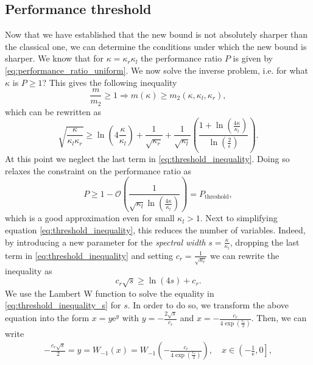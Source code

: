 \subsection{Performance threshold}\label{sec:performance_threshold}
Now that we have established that the new bound is not absolutely sharper than the classical one, we can determine the conditions under which the new bound is sharper. We know that for $\kappa=\kappa_r\kappa_l$ the performance ratio $P$ is given by \cref{eq:performance_ratio_uniform}. We now solve the inverse problem, i.e. for what $\kappa$ is $P \geq 1$? This gives the following inequality
\[
    \frac{m}{m_2} \geq 1 \Rightarrow m(\kappa) \geq m_2(\kappa, \kappa_l, \kappa_r),
\]
which can be rewritten as
\begin{equation}
    \sqrt{\frac{\kappa}{\kappa_l\kappa_r}} \geq \ln\left(4\frac{\kappa}{\kappa_l}\right) + \frac{1}{\sqrt{\kappa_r}} + \frac{1}{\sqrt{\kappa_l}}\left(\frac{1 + \ln\left(\frac{4\kappa}{\kappa_l}\right)}{\ln\left(\frac{2}{\epsilon}\right)}\right).
    \label{eq:threshold_inequality}
\end{equation}
At this point we neglect the last term in \cref{eq:threshold_inequality}. Doing so relaxes the constraint on the performance ratio as
\begin{equation}
    P \geq 1 - \mathcal{O}\left(\frac{1}{\sqrt{\kappa_l}\ln\left(\frac{4\kappa}{\kappa_l}\right)}\right) = P_{\text{threshold}},
    \label{eq:approximate_performance_ratio_threshold}
\end{equation}
which is a good approximation even for small $\kappa_l> 1$. Next to simplifying equation \cref{eq:threshold_inequality}, this reduces the number of variables. Indeed, by introducing a new parameter for the \textit{spectral width} $s = \frac{\kappa}{\kappa_l}$, dropping the last term in \cref{eq:threshold_inequality} and setting $c_r = \frac{1}{\sqrt{\kappa_r}}$ we can rewrite the inequality as
\begin{equation}
    c_r\sqrt{s} \geq \ln\left(4s\right) + c_r.
    \label{eq:threshold_inequality_s}
\end{equation}
We use the Lambert $\mathrm{W}$ function to solve the equality in \cref{eq:threshold_inequality_s} for $s$. In order to do so, we transform the above equation into the form $x = y \mathrm{e}^y$ with $y = -\frac{2\sqrt{s}}{c_r}$ and $x = -\frac{c_r}{4\exp\left(\frac{c_r}{2}\right)}$. Then, we can write
\begin{align*}
    -\frac{c_r\sqrt{s}}{2} = y = W_{-1}(x) = W_{-1}\left(-\frac{c_r}{4\exp\left(\frac{c_r}{2}\right)}\right), \quad x \in \left(-\frac{1}{\mathrm{e}}, 0 \right],
\end{align*}

